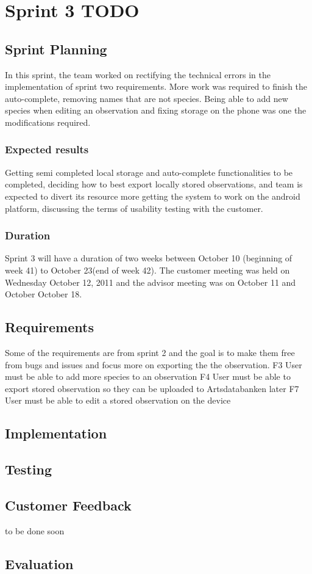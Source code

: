 \section{Sprint 3 TODO}

	\subsection{Sprint Planning}
In this sprint, the team worked on rectifying the technical errors in the implementation of sprint two requirements. More work was required to finish the auto-complete, removing names that are not species. Being able to add new species when editing an observation and fixing storage on the phone was one the modifications required. 
	\subsubsection{Expected results}
Getting semi completed local storage and auto-complete functionalities to be completed, deciding how to best export locally stored observations, and team is expected to divert its resource more getting the system to work on the android platform, discussing the terms of usability testing with the customer.
	\subsubsection{Duration}
Sprint 3 will have a duration of two weeks between October 10 (beginning of week 41) to October 23(end of week 42). The customer meeting was held on Wednesday October 12, 2011 and the advisor meeting was on October 11 and October October 18.
	\subsection{Requirements}
Some of the requirements are from sprint 2 and the goal is to make them free from bugs and issues and focus more on exporting the the observation.
F3 User must be able to add more species to an observation
F4 User must be able to export stored observation so they can be uploaded to Artsdatabanken later
F7 User must be able to edit a stored observation on the device

	\subsection{Implementation}

	\subsection{Testing}

	\subsection{Customer Feedback}
to be done soon
	\subsection{Evaluation}
